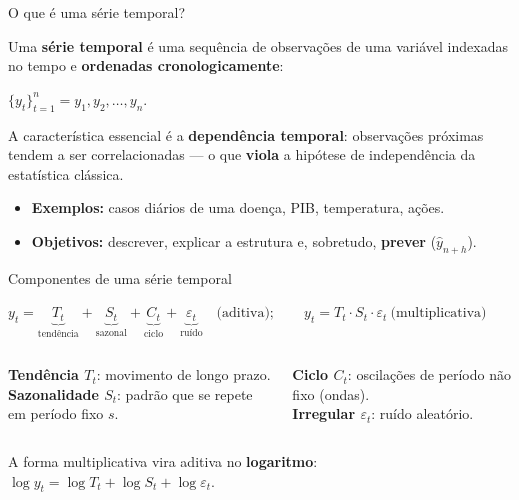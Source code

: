 \documentclass[aspectratio=169,11pt]{beamer}
\newcommand{\dest}[1]{\textcolor{emph}{\textbf{#1}}}
\newcommand{\eqbox}[1]{\begin{center}\begin{tcolorbox}[enhanced,colback=white,opacityback=0.06,
   colframe=pitchred,boxrule=1.1pt,arc=2mm,coltext=white,width=0.92\linewidth,halign=center,
   top=1.4mm,bottom=1.4mm]$\displaystyle #1$\end{tcolorbox}\end{center}}
\begin{document}
\begin{frame}{O que é uma série temporal?}
  \begin{tcolorbox}[pitchtitled,title=Definição]
    Uma \dest{série temporal} é uma sequência de observações de uma variável
    indexadas no tempo e \dest{ordenadas cronologicamente}:
    \eqbox{\{y_t\}_{t=1}^{n} = y_1, y_2, \ldots, y_n .}
  \end{tcolorbox}
  \vspace{0.4em}
  A característica essencial é a \dest{dependência temporal}: observações
  próximas tendem a ser correlacionadas — o que \dest{viola} a hipótese de
  independência da estatística clássica.
  \begin{itemize}
    \item \textbf{Exemplos:} casos diários de uma doença, PIB, temperatura, ações.
    \item \textbf{Objetivos:} descrever, explicar a estrutura e, sobretudo,
          \dest{prever} ($\hat{y}_{n+h}$).
  \end{itemize}
\end{frame}

\begin{frame}{Componentes de uma série temporal}
  \eqbox{y_t = \underbrace{T_t}_{\text{tend\^encia}} + \underbrace{S_t}_{\text{sazonal}}
        + \underbrace{C_t}_{\text{ciclo}} + \underbrace{\varepsilon_t}_{\text{ru\'ido}}
        \quad\text{(aditiva)};\qquad y_t = T_t\cdot S_t\cdot\varepsilon_t\ \text{(multiplicativa)}}
  \begin{columns}[T]
      \begin{tcolorbox}[pitchbox]
        \textbf{Tendência $T_t$}: movimento de longo prazo.\\[0.3em]
        \textbf{Sazonalidade $S_t$}: padrão que se repete em período fixo $s$.
      \end{tcolorbox}
      \begin{tcolorbox}[pitchbox]
        \textbf{Ciclo $C_t$}: oscilações de período não fixo (ondas).\\[0.3em]
        \textbf{Irregular $\varepsilon_t$}: ruído aleatório.
      \end{tcolorbox}
  \end{columns}
  \vspace{0.3em}
  \centering\footnotesize A forma multiplicativa vira aditiva no \dest{logaritmo}:
  $\log y_t=\log T_t+\log S_t+\log\varepsilon_t$.
\end{frame}
\end{document}
